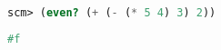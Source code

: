 
\begin{lstlisting}[language=Scheme]
scm> (even? (+ (- (* 5 4) 3) 2))
\end{lstlisting}
\begin{solution}[0.15in]
\begin{lstlisting}[language=Scheme]
#f
\end{lstlisting}
\end{solution}

